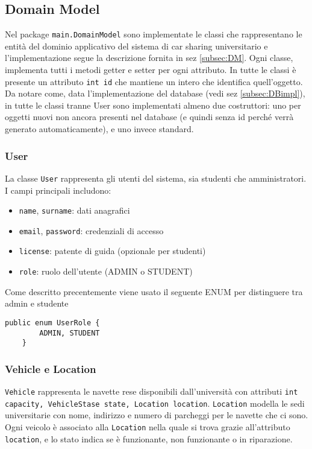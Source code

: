 \subsection{Domain Model}
Nel package \texttt{main.DomainModel} sono implementate le classi che rappresentano le entità del dominio applicativo del sistema di car sharing universitario e  l'implementazione segue la descrizione fornita in sez \ref{subsec:DM}. Ogni classe, implementa tutti i metodi getter e setter per ogni attributo.
In tutte le classi è presente un attributo \texttt{int id} che mantiene un intero che identifica quell'oggetto.\\
Da notare come, data l'implementazione del database (vedi sez \ref{subsec:DBimpl}), in tutte le classi tranne User sono implementati almeno due costruttori: uno per oggetti nuovi non ancora presenti nel database (e quindi senza id perché verrà generato automaticamente), e uno invece standard.
\subsubsection{User}
La classe \texttt{User} rappresenta gli utenti del sistema, sia studenti che amministratori. I campi principali includono:
\begin{itemize}
\item \texttt{name}, \texttt{surname}: dati anagrafici
\item \texttt{email}, \texttt{password}: credenziali di accesso
\item \texttt{license}: patente di guida (opzionale per studenti)
\item \texttt{role}: ruolo dell'utente (ADMIN o STUDENT)
\end{itemize}
Come descritto precentemente viene usato il seguente ENUM per distinguere tra admin e studente
\begin{lstlisting}[style=java, caption={UserRole ENUM}]
public enum UserRole {
        ADMIN, STUDENT 
    }
\end{lstlisting}

\subsubsection{Vehicle e Location}
\texttt{Vehicle} rappresenta le navette rese disponibili dall'università con attributi \texttt{int capacity, VehicleStase state, Location location}. \texttt{Location} modella le sedi universitarie con nome, indirizzo e numero di parcheggi per le navette che ci sono.
Ogni veicolo è associato alla \texttt{Location} nella quale si trova grazie all'attributo \texttt{location}, e lo stato indica se è funzionante, non funzionante o in riparazione.
